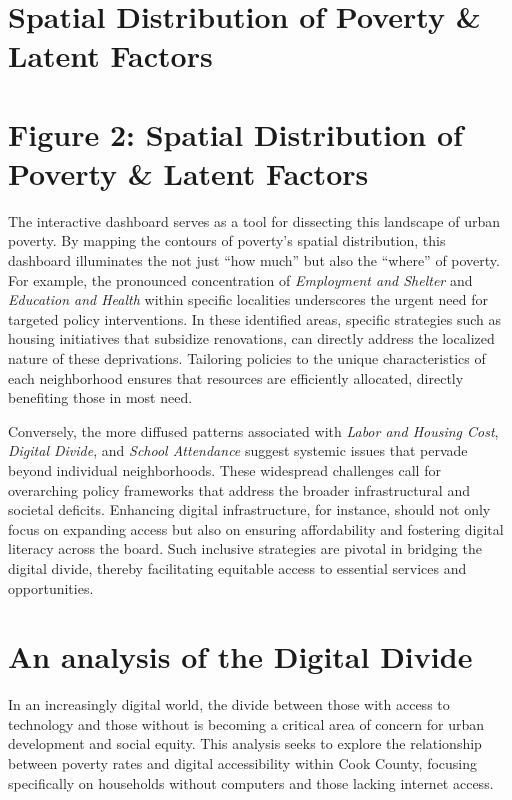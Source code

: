 \documentclass[
  letterpaper,
  DIV=11,
  numbers=noendperiod]{scrreprt}
\begin{document}
\chapter{Spatial Distribution of Poverty \& Latent
Factors}\label{spatial-distribution-of-poverty-latent-factors}


\chapter{Figure 2: Spatial Distribution of Poverty \& Latent
Factors}\label{figure-2-spatial-distribution-of-poverty-latent-factors}

The interactive dashboard serves as a tool for dissecting this landscape
of urban poverty. By mapping the contours of poverty's spatial
distribution, this dashboard illuminates the not just ``how much'' but
also the ``where'' of poverty. For example, the pronounced concentration
of \emph{Employment and Shelter} and \emph{Education and Health} within
specific localities underscores the urgent need for targeted policy
interventions. In these identified areas, specific strategies such as
housing initiatives that subsidize renovations, can directly address the
localized nature of these deprivations. Tailoring policies to the unique
characteristics of each neighborhood ensures that resources are
efficiently allocated, directly benefiting those in most need.

Conversely, the more diffused patterns associated with \emph{Labor and
Housing Cost}, \emph{Digital Divide}, and \emph{School Attendance}
suggest systemic issues that pervade beyond individual neighborhoods.
These widespread challenges call for overarching policy frameworks that
address the broader infrastructural and societal deficits. Enhancing
digital infrastructure, for instance, should not only focus on expanding
access but also on ensuring affordability and fostering digital literacy
across the board. Such inclusive strategies are pivotal in bridging the
digital divide, thereby facilitating equitable access to essential
services and opportunities.


\chapter{An analysis of the Digital
Divide}\label{an-analysis-of-the-digital-divide}

In an increasingly digital world, the divide between those with access
to technology and those without is becoming a critical area of concern
for urban development and social equity. This analysis seeks to explore
the relationship between poverty rates and digital accessibility within
Cook County, focusing specifically on households without computers and
those lacking internet access.
\end{document}
